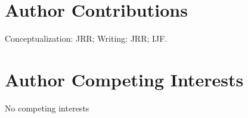 \documentclass[letterpaper,8pt]{extarticle}  %
\begin{document}
\section{Author Contributions}
Conceptualization: JRR; Writing: JRR; IJF.  

\section{Author Competing Interests}
No competing interests

\renewcommand\refname{References}
\begin{footnotesize}
\textnormal{}
\end{footnotesize}
\newpage


\newpage


% 
\end{document}
